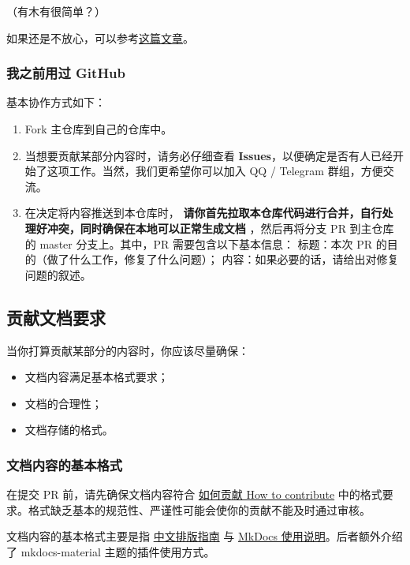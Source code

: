 （有木有很简单？）

如果还是不放心，可以参考\href{https://juejin.im/entry/56e638591ea49300550885cc}{这篇文章}。

\subsubsection{我之前用过 GitHub}

基本协作方式如下：

\begin{enumerate}
\item Fork 主仓库到自己的仓库中。
\item 当想要贡献某部分内容时，请务必仔细查看 \textbf{Issues}，以便确定是否有人已经开始了这项工作。当然，我们更希望你可以加入 QQ / Telegram 群组，方便交流。
\item 在决定将内容推送到本仓库时，\textbf{ 请你首先拉取本仓库代码进行合并，自行处理好冲突，同时确保在本地可以正常生成文档 }，然后再将分支 PR 到主仓库的 master 分支上。其中，PR 需要包含以下基本信息：
标题：本次 PR 的目的（做了什么工作，修复了什么问题）；
内容：如果必要的话，请给出对修复问题的叙述。
\end{enumerate}

\subsection{贡献文档要求}

当你打算贡献某部分的内容时，你应该尽量确保：

\begin{itemize}
\item 文档内容满足基本格式要求；
\item 文档的合理性；
\item 文档存储的格式。
\end{itemize}

\subsubsection{文档内容的基本格式}

在提交 PR 前，请先确保文档内容符合 \href{https://github.com/24OI/OI-wiki/wiki/%E5%A6%82%E4%BD%95%E8%B4%A1%E7%8C%AE---How-to-contribute}{如何贡献 How to contribute} 中的格式要求。格式缺乏基本的规范性、严谨性可能会使你的贡献不能及时通过审核。

文档内容的基本格式主要是指 \href{https://github.com/ctf-wiki/ctf-wiki/wiki/%E4%B8%AD%E6%96%87%E6%8E%92%E7%89%88%E6%8C%87%E5%8D%97}{中文排版指南} 与 \href{https://github.com/ctf-wiki/ctf-wiki/wiki/Mkdocs-%E4%BD%BF%E7%94%A8%E8%AF%B4%E6%98%8E}{MkDocs 使用说明}。后者额外介绍了 mkdocs-material 主题的插件使用方式。

